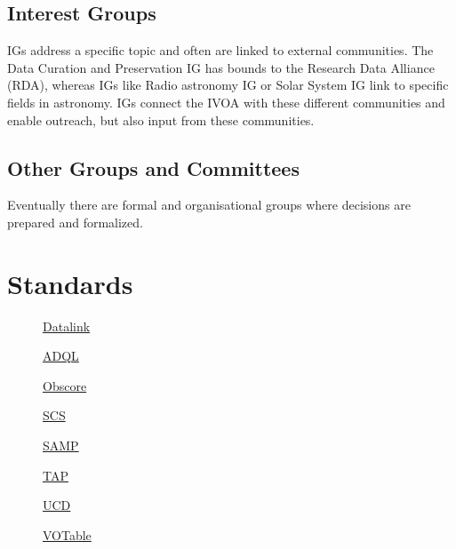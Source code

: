 \documentclass[twoside]{article}[12pt]
\begin{document}
\subsection*{Interest Groups}
IGs address a specific topic and often are linked to external
communities. The Data Curation and Preservation IG has bounds to the
Research Data Alliance (RDA), whereas IGs like Radio astronomy IG or
Solar System IG link to specific fields in astronomy. IGs connect the
IVOA with these different communities and enable outreach, but also
input from these communities. 
  
\DCP
\EDU
\KDD
\OPERATIONS
\RADIO 
\SOLAR
\THEORY
\TIMEDOMAIN
 

\subsection*{Other Groups and Committees}
Eventually there are formal and organisational groups where decisions
are prepared and formalized. 

\EXEC
\TCG
\CSP
\SCSP


\section{Standards}
\begin{description}

\item[]\href{https://www.ivoa.net/documents/DataLink/20150617/index.html}{Datalink}

\item[]\href{http://www.ivoa.net/documents/REC/ADQL/ADQL-20081030.pdf}{ADQL}

\item[]\href{https://www.ivoa.net/documents/ObsCore/}{Obscore}


\item[]
\href{https://www.ivoa.net/documents/latest/ConeSearch.html}{SCS}

\item[] \href{https://www.ivoa.net/documents/SAMP/}{SAMP}

\item[]\href{https://www.ivoa.net/documents/TAP/20190927/index.html}{TAP}

\item[]\href{https://www.ivoa.net/documents/cover/UCD-20050812.html}{UCD}

\item[]\href{http://www.ivoa.net/documents/VOTable/20130920/REC-VOTable-1.3-20130920.html}{VOTable}


\end{description}
\end{document}
